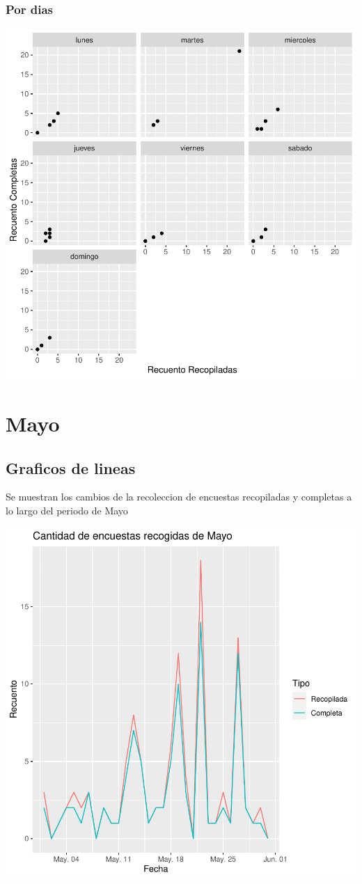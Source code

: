 \documentclass{article}
\begin{document}
\subsubsection{Por dias}

\includegraphics{seguimento2-076}

\section{Mayo}
\subsection{Graficos de lineas}
Se muestran los cambios de la recoleccion de encuestas recopiladas y completas a lo largo del periodo de Mayo

\includegraphics{seguimento2-077}
\end{document}
